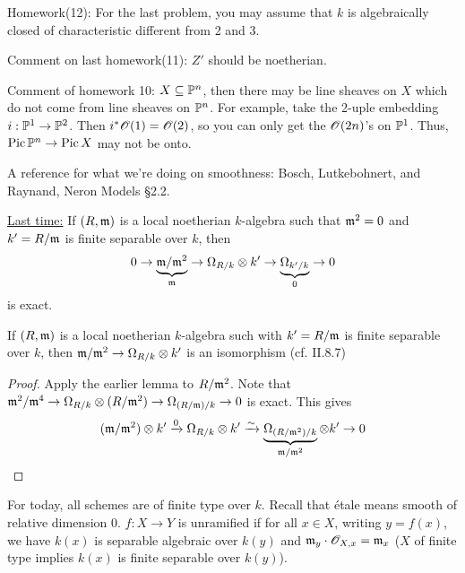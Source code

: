  \setcounter{lecture}{29}

 Homework(12):  For the last problem, you may
 assume that $k$ is algebraically closed of characteristic
 different from 2 and 3.

 Comment on last homework(11): $Z'$ should be noetherian.

 Comment of homework 10: $X\subseteq \P^n$, then there may be line
 sheaves on $X$ which do not come from line sheaves on $\P^n$.
 For example, take the 2-uple embedding $i:\P^1\to \P^2$.  Then
 $i^*\O(1) = \O(2)$, so you can only get the $\O(2n)$'s on $\P^1$.
 Thus, $\pic \P^n \to \pic X$ may not be onto.

 A reference for what we're doing on smoothness:  Bosch,
 Lutkebohnert, and Raynand, Neron Models \S 2.2.

 \underline{Last time:} If $(R,\m)$ is a local noetherian
 $k$-algebra such that $\m^2=0$ and $k'=R/\m$ is finite separable
 over $k$, then
 \[
 0\to \underbrace{\m/\m^2}_{\m} \to \Omega_{R/k}\otimes k' \to
 \underbrace{\Omega_{k'/k}}_0 \to 0
 \]
 is exact.

 \begin{corollary}
 If $(R,\m)$ is a local noetherian
 $k$-algebra such with $k'=R/\m$ is finite separable
 over $k$, then $\m/\m^2 \to \Omega_{R/k}\otimes k'$ is an
 isomorphism (cf. II.8.7)
 \end{corollary}
 \begin{proof}
   Apply the earlier lemma to $R/\m^2$.  Note that $\m^2/\m^4 \to
   \Omega_{R/k}\otimes (R/\m^2) \to \Omega_{(R/\m)/k} \to 0$ is
   exact.  This gives
   \[
    (\m/\m^2)\otimes k' \xrightarrow{0} \Omega_{R/k}\otimes k'
    \xrightarrow{\sim} \underbrace{\Omega_{(R/\m^2)/k}}_{\m/\m^2}\otimes k'
    \to 0
   \]
 \end{proof}

 For today, all schemes are of finite type over $k$.  Recall that
 \'etale means smooth of relative dimension 0.  $f:X\to Y$ is
 unramified if for all $x\in X$, writing $y=f(x)$, we have $k(x)$
 is separable algebraic over $k(y)$ and $\m_y\cdot \O_{X,x}=\m_x$
 ($X$ of finite type implies $k(x)$ is finite separable over
 $k(y)$).

